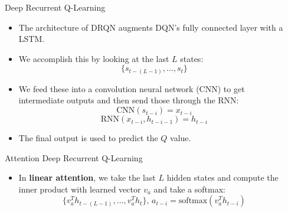 \documentclass[final]{beamer}
\newlength{\onecolwid}
\newlength{\twocolwid}
\begin{document}
\begin{frame}[t]
\begin{columns}[t]
\begin{column}{\twocolwid}
\begin{columns}[t,totalwidth=\twocolwid]
\begin{column}{\onecolwid}

\begin{block}{Deep Recurrent Q-Learning}
\begin{itemize}
    \item The architecture of DRQN augments DQN's fully connected layer with a LSTM.
    \item We accomplish this by looking at the last $L$ states:
        $$ \{s_{t-(L-1)}, \dots, s_{t}\} $$
    \item We feed these into a convolution neural network (CNN) to get intermediate
        outputs and then send those through the RNN:
        $$\text{CNN}(s_{t-i}) = x_{t-i}$$
        $$\text{RNN}(x_{t-i}, h_{t-i-1}) = h_{t-i}$$
    \item The final output is used to predict the $Q$ value.
\end{itemize}

\end{block}

\begin{block}{Attention Deep Recurrent Q-Learning}
    \begin{itemize}
        \item In \textbf{linear attention}, we take the last $L$ hidden states and
            compute the inner product with learned vector $v_a$ and take a softmax:
            $$\{v_a^Th_{t-(L-1)}, \dots, v_a^Th_t\} \text{, }
              a_{t-i} = \text{softmax}(v_a^Th_{t-i})$$
    \end{itemize}
\end{block}


\end{column} %

\begin{column}{\onecolwid}\vspace{-.6in} %



\end{column}
\end{columns}
\end{column}
\end{columns}
\end{frame}
\end{document}
